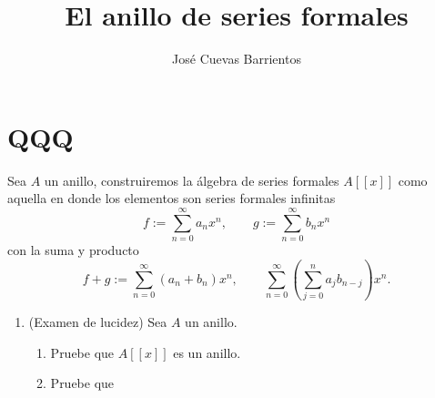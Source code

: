 \documentclass[11pt, reqno]{amsart}
\title{El anillo de series formales}
\date{\DTMdate{2025-05-22}}
\author{José Cuevas Barrientos}
\begin{document}
\maketitle

\nocite{atiyah:commutative}
\nocite{matsumura:ring}

\section{QQQ}
Sea $A$ un anillo, construiremos la álgebra de series formales $A[\![x]\!]$ como aquella en donde los elementos son series formales infinitas
\[
	f := \sum_{n=0}^{\infty} a_n x^n, \qquad g := \sum_{n=0}^{\infty} b_n x^n
\]
con la suma y producto
\[
	f+g := \sum_{n=0}^{\infty} (a_n+b_n)x^n, \qquad \sum_{n=0}^{\infty} \left( \sum_{j=0}^{n} a_jb_{n-j} \right)x^n.
\]

\begin{enumerate}
	\item\lookright
		(Examen de lucidez)
		Sea $A$ un anillo.
		\begin{enumerate}
			\item Pruebe que $A[\![x]\!]$ es un anillo.
			\item Pruebe que 
		\end{enumerate}
\end{enumerate}


\end{document}
